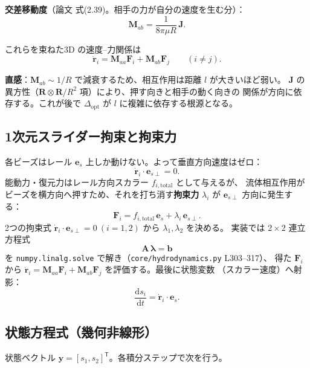 \documentclass[11pt,a4paper]{article}
\newcommand{\es}{\bm{e}_{s}}
\newcommand{\esp}{\bm{e}_{s\perp}}
\newcommand{\rv}{\bm{r}}
\newcommand{\Fv}{\bm{F}}
\newcommand{\Mab}{\bm{M}_{ab}}
\newcommand{\Maa}{\bm{M}_{aa}}
\newcommand{\dd}{\mathrm{d}}
\newcommand{\Dopt}{\Delta_{\mathrm{opt}}}
\begin{document}
\textbf{交差移動度}（論文 式(2.39)。相手の力が自分の速度を生む分）：
\begin{equation}
\Mab=\frac{1}{8\pi\mu R}\,\bm J.
\end{equation}

これらを束ねた3D の速度--力関係は
\begin{equation}
\dot{\rv}_i=\Maa\Fv_i+\Mab\Fv_j\qquad(i\neq j).
\end{equation}

\begin{keybox}
\textbf{直感}：$\Mab\sim 1/R$ で減衰するため、相互作用は距離 $l$ が大きいほど弱い。
$\bm J$ の異方性（$\bm R\otimes\bm R/R^2$ 項）により、押す向きと相手の動く向きの
関係が方向に依存する。これが後で $\Dopt$ が $l$ に複雑に依存する根源となる。
\end{keybox}

\subsection{1次元スライダー拘束と拘束力}

各ビーズはレール $\es$ 上しか動けない。よって垂直方向速度はゼロ：
\begin{equation}
\dot{\rv}_i\cdot\esp=0.
\end{equation}
能動力・復元力はレール方向スカラー $f_{i,\mathrm{total}}$ として与えるが、
流体相互作用がビーズを横方向へ押すため、それを打ち消す\textbf{拘束力}
$\lambda_i$ が $\esp$ 方向に発生する：
\begin{equation}
\Fv_i=f_{i,\mathrm{total}}\,\es+\lambda_i\,\esp.
\end{equation}
2つの拘束式 $\dot{\rv}_i\cdot\esp=0\ (i=1,2)$ から $\lambda_1,\lambda_2$ を決める。
実装では $2\times2$ 連立方程式
\begin{equation}
\bm A\,\bm\lambda=\bm b
\end{equation}
を \texttt{numpy.linalg.solve} で解き（\texttt{core/hydrodynamics.py} L303--317）、
得た $\Fv_i$ から $\dot{\rv}_i=\Maa\Fv_i+\Mab\Fv_j$ を評価する。最後に状態変数
（スカラー速度）へ射影：
\begin{equation}
\frac{\dd s_i}{\dd t}=\dot{\rv}_i\cdot\es.
\end{equation}

\subsection{状態方程式（幾何非線形）}

状態ベクトル $\bm y=[s_1,s_2]^{\mathsf T}$。各積分ステップで次を行う。
\end{document}
